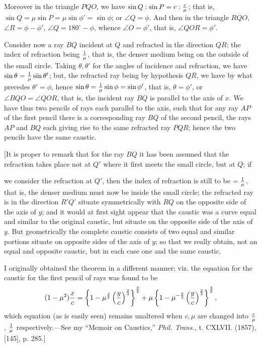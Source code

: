 \documentclass[11pt,a4paper]{article}
\theoremstyle{plain}
\theoremstyle{definition}
\begin{document}
Moreover in the triangle $PQO$, we have $\sin Q:\sin P=c:{c\over\mu}$; that is, $\sin Q=\mu\sin P=\mu\sin\phi'=\sin\phi$; or $\angle Q=\phi$. And then in the triangle $RQO$, $\angle R=\phi-\phi'$, $\angle Q=180^\circ-\phi$, whence $\angle O=\phi'$, that is, $\angle QOR=\phi'$.

Consider now a ray $BQ$ incident at $Q$ and refracted in the direction $QR$; the index of refraction being ${1\over\mu}$, that is, the denser medium being on the outside of the small circle. Taking $\theta,\theta'$ for the angles of incidence and refraction, we have $\sin\theta={1\over\mu}\sin\theta'$; but, the refracted ray being by hypothesis $QR$, we have by what precedes $\theta'=\phi$, hence $\sin\theta={1\over\mu}\sin\phi=\sin\phi'$, that is, $\theta=\phi'$, or $\angle BQO=\angle QOR$, that is, the incident ray $BQ$ is parallel to the axis of $x$. We have thus two pencils of rays each parallel to the axis, such that for any ray $AP$ of the first pencil there is a corresponding ray $BQ$ of the second pencil, the rays $AP$ and $BQ$ each giving rise to the same refracted ray $PQR$; hence the two pencils have the same caustic.

[It is proper to remark that for the ray $BQ$ it has been assumed that the refraction takes place not at $Q'$ where it first meets the small circle, but at $Q$; if

\newpage

we consider the refraction at $Q'$, then the index of refraction is still to be $={1\over\mu}$, that is, the denser medium must now be inside the small circle; the refracted ray is in the direction $R'Q'$ situate symmetrically with $RQ$ on the opposite side of the axis of $y$; and it would at first sight appear that the caustic was a curve equal and similar to the original caustic, but situate on the opposite side of the axis of $y$. But geometrically the complete caustic consists of two equal and similar portions situate on opposite sides of the axis of $y$; so that we really obtain, not an equal and opposite caustic, but in each case one and the same caustic.

I originally obtained the theorem in a different manner; viz. the equation for the caustic for the first pencil of rays was found to be
\[
(1-\mu^2){x\over c}=
\left\{1-\mu^{4\over3}\left({y\over c}\right)^{2\over3}\right\}^{3\over2}
+\mu\left\{1-\mu^{-{2\over3}}\left({y\over c}\right)^{2\over3}\right\}^{3\over2},
\]
which equation (as is easily seen) remains unaltered when $c,\mu$ are changed into ${c\over\mu}$, ${1\over\mu}$ respectively.---See my ``Memoir on Caustics,'' \textit{Phil. Trans.}, t. CXLVII. (1857), [145], p. 285.]
\end{document}
